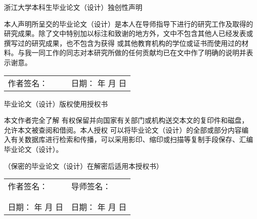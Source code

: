 {
  \setlength{\parindent}{0em}
  \linespread{1}

  \vspace*{0.6em}

  {
    \centering
    \songti\xiaoer
    浙江大学本科生毕业论文（设计）独创性声明 \par
  }

  \vspace{3.1em}

  {
    \setlength{\parindent}{2em}
    \linespread{1.6}
    \songti\xiaosi
    本人声明所呈交的毕业论文（设计）是本人在导师指导下进行的研究工作及取得的研究成果。除了文中特别加以标注和致谢的地方外，文中不包含其他人已经发表或撰写过的研究成果，也不包含为获得 \underline{\kaiti\sihao\bfseries {}} 或其他教育机构的学位或证书而使用过的材料。与我一同工作的同志对本研究所做的任何贡献均已在文中作了明确的说明并表示谢意。 \par
  }

  \vspace{2.9em}

  {
    \songti\xiaosi
    \begin{tabular}{@{} p{0.5\linewidth} p{0.5\linewidth} @{}}
    作者签名： & 日期： \hspace{4em} 年 \hspace{2em} 月 \hspace{2em} 日 \\
    \end{tabular} \par
  }

  \vspace{4.85em}

  {
    \centering
    \songti\xiaoer
    毕业论文（设计）版权使用授权书 \par
  }

  \vspace{2.2em}

  {
    \setlength{\parindent}{2em}
    \linespread{1.6}
    \songti\xiaosi
    本文作者完全了解 \underline{\kaiti\sihao\bfseries {}} 有权保留并向国家有关部门或机构送交本文的复印件和磁盘，允许本文被查阅和借阅。本人授权 \underline{\kaiti\sihao\bfseries {}} 可以将毕业论文（设计）的全部或部分内容编入有关数据库进行检索和传播，可以采用影印、缩印或扫描等复制手段保存、汇编毕业论文（设计）。

    （保密的毕业论文（设计）在解密后适用本授权书） \par
  }

  \vspace{2.9em}

  {
    \songti\xiaosi
    \begin{tabular}{@{} p{0.5\linewidth} p{0.5\linewidth} @{}}
    作者签名： & 导师签名： \\
     & \\
     & \\
    日期： \hspace{4em} 年 \hspace{2em} 月 \hspace{2em} 日 & 日期： \hspace{4em} 年 \hspace{2em} 月 \hspace{2em} 日 \\
    \end{tabular} \par
  }
}
